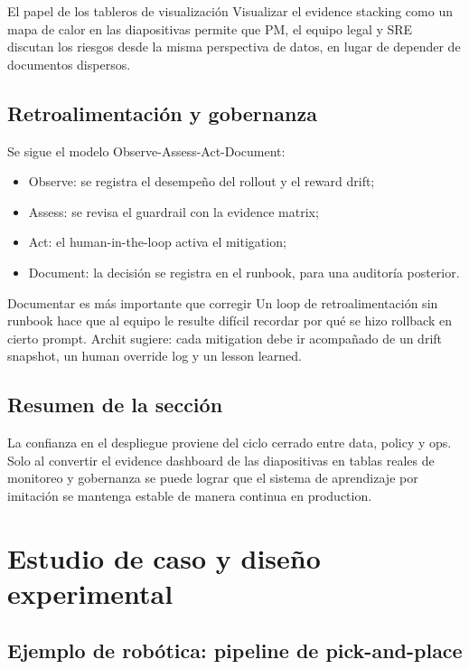 \documentclass[a4paper]{article}
\begin{document}
\begin{importantbox}{El papel de los tableros de visualización}
Visualizar el evidence stacking como un mapa de calor en las diapositivas permite que PM, el equipo legal y SRE discutan los riesgos desde la misma perspectiva de datos, en lugar de depender de documentos dispersos.
\end{importantbox}

\subsection{Retroalimentación y gobernanza}

Se sigue el modelo Observe-Assess-Act-Document:
\begin{itemize}
    \item Observe: se registra el desempeño del rollout y el reward drift;
    \item Assess: se revisa el guardrail con la evidence matrix;
    \item Act: el human-in-the-loop activa el mitigation;
    \item Document: la decisión se registra en el runbook, para una auditoría posterior.
\end{itemize}

\begin{warningbox}{Documentar es más importante que corregir}
Un loop de retroalimentación sin runbook hace que al equipo le resulte difícil recordar por qué se hizo rollback en cierto prompt. Archit sugiere: cada mitigation debe ir acompañado de un drift snapshot, un human override log y un lesson learned.
\end{warningbox}

\subsection{Resumen de la sección}

La confianza en el despliegue proviene del ciclo cerrado entre data, policy y ops. Solo al convertir el evidence dashboard de las diapositivas en tablas reales de monitoreo y gobernanza se puede lograr que el sistema de aprendizaje por imitación se mantenga estable de manera continua en production.

\section{Estudio de caso y diseño experimental}

\subsection{Ejemplo de robótica: pipeline de pick-and-place}
\end{document}
